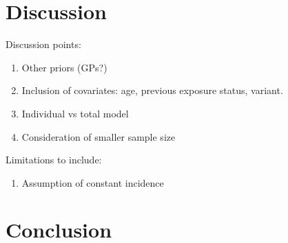 \documentclass[thesis.tex]{subfiles}
\begin{document}
\section{Discussion} \label{perf-test:sec:discussion}

Discussion points:
\begin{enumerate}
  \item Other priors (GPs?)
  \item Inclusion of covariates: age, previous exposure status, variant.
  \item Individual vs total model
  \item Consideration of smaller sample size
\end{enumerate}

Limitations to include:
\begin{enumerate}
  \item Assumption of constant incidence
\end{enumerate}

\section{Conclusion} \label{perf-test:sec:conclusion}

\ifSubfilesClassLoaded{
  \appendix
  
  \listoftodos
}{}
\end{document}
